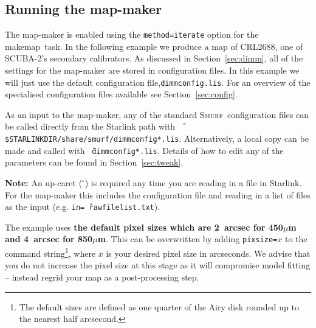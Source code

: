\documentclass[twoside,11pt]{article}
\newcommand{\htmladdnormallink}[2]{#1}
\newcommand{\xref}[3]{#1}
\newcommand{\xlabel}[1]{}
\renewcommand{\_}{\texttt{\symbol{95}}}
\newcommand{\starlink}{\htmladdnormallink{Starlink}{http://starlink.jach.hawaii.edu}}
\newcommand{\smurf}{\xref{\textsc{Smurf}}{sun258}{}}
\newcommand{\task}[1]{\textsf{#1}}
\newcommand{\makemap}{\xref{\task{makemap}}{sun258}{MAKEMAP}}
\begin{document}
\subsection{\xlabel{running_dimm}Running the map-maker}

The map-maker is enabled using the \texttt{method=iterate} option for the
\makemap\ task. In the following example we produce a map of CRL2688,
one of SCUBA-2's secondary calibrators. As discussed in
Section~\ref{sec:dimm}, all of the settings for the map-maker are
stored in configuration files.  In this example we will just use the
default configuration file,\texttt{dimmconfig.lis}. For an overview of
the specialised configuration files available see
Section~\ref{sec:config}.

As an input to the map-maker, any of the standard \smurf\
configuration files can be called directly from the Starlink path
with \texttt{\^\,\$STARLINK\_DIR/share/smurf/dimmconfig*.lis}.
Alternatively, a local copy can be made and called with
\texttt{\^\,dimmconfig*.lis}. Details of how to edit any of the
parameters can be found in Section~\ref{sec:tweak}.

\textbf{Note:} An up-caret (\,\^\,) is required any time you are reading in
a file in \starlink. For the map-maker this includes the configuration
file and reading in a list of files as the input (e.g.
\texttt{in=\^\,rawfilelist.txt}).

The example uses \textbf{the
default pixel sizes which are 2~arcsec for 450$\mu$m and 4~arcsec for
850$\mu$m}. This can be overwritten by adding \texttt{pixsize=}$x$ to the
command string\footnote{The default sizes are defined as one quarter
of the Airy disk rounded up to the nearest half arcsecond.}, where $x$
is your desired pixel size in arcseconds. We advise that you do not
increase the pixel size at this stage as it will compromise model
fitting -- instead regrid your map as a post-processing step.
\end{document}
